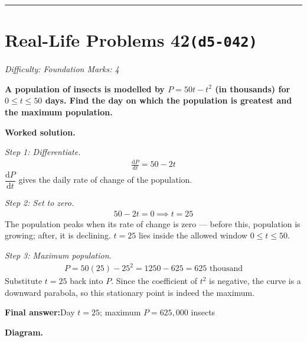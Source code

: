 \documentclass[11pt]{article}
\newcommand{\question}[1]{\par\medskip\noindent\textbf{#1}\par}
\begin{document}
\medskip\hrule

\section*{Real-Life Problems 42\quad\small\texttt{(d5-042)}}
\textit{Difficulty: Foundation \quad\textbar\quad Marks: 4}

\question{A population of insects is modelled by \( P = 50t - t^2 \) (in thousands) for \( 0 \le t \le 50 \) days. Find the day on which the population is greatest and the maximum population.}

\textbf{Worked solution.}

\textit{Step 1: Differentiate.}
\[\begin{gathered}
\frac{\mathrm{d}P}{\mathrm{d}t} = 50 - 2t
\end{gathered}\]
\( \dfrac{\mathrm{d}P}{\mathrm{d}t} \) gives the daily rate of change of the population.

\textit{Step 2: Set to zero.}
\[\begin{gathered}
50 - 2t = 0 \implies t = 25
\end{gathered}\]
The population peaks when its rate of change is zero --- before this, population is growing; after, it is declining. \( t = 25 \) lies inside the allowed window \( 0 \le t \le 50 \).

\textit{Step 3: Maximum population.}
\[\begin{gathered}
P = 50(25) - 25^2 = 1250 - 625 = 625 \text{ thousand}
\end{gathered}\]
Substitute \( t = 25 \) back into \( P \). Since the coefficient of \( t^2 \) is negative, the curve is a downward parabola, so this stationary point is indeed the maximum.

\begin{answerbox}
\textbf{Final answer:}\quad Day \(\displaystyle  t = 25 \); maximum \(\displaystyle  P = 625{,}000 \) insects
\end{answerbox}
\textbf{Diagram.}
\end{document}
